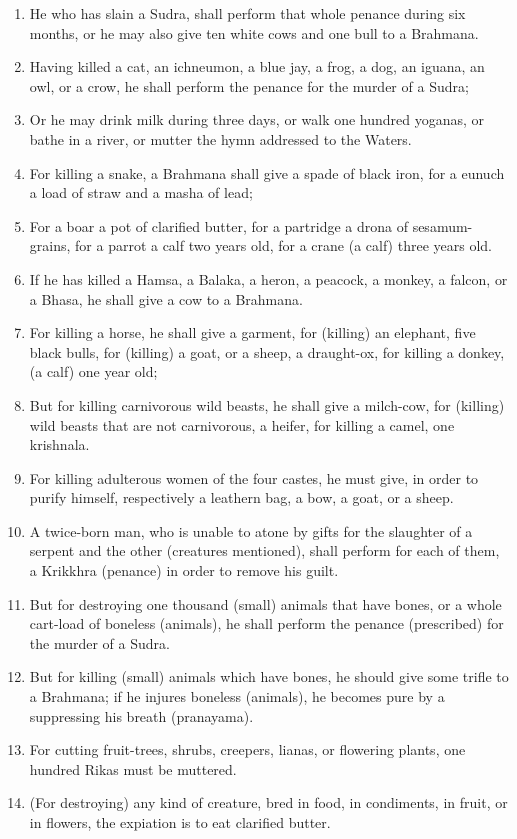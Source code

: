 \begin{enumerate}
\item He who has slain a Sudra, shall perform that whole penance during six months, or he may also give ten white cows and one bull to a Brahmana.
\item Having killed a cat, an ichneumon, a blue jay, a frog, a dog, an iguana, an owl, or a crow, he shall perform the penance for the murder of a Sudra;
\item Or he may drink milk during three days, or walk one hundred yoganas, or bathe in a river, or mutter the hymn addressed to the Waters.
\item For killing a snake, a Brahmana shall give a spade of black iron, for a eunuch a load of straw and a masha of lead;
\item For a boar a pot of clarified butter, for a partridge a drona of sesamum-grains, for a parrot a calf two years old, for a crane (a calf) three years old.
\item If he has killed a Hamsa, a Balaka, a heron, a peacock, a monkey, a falcon, or a Bhasa, he shall give a cow to a Brahmana.
\item For killing a horse, he shall give a garment, for (killing) an elephant, five black bulls, for (killing) a goat, or a sheep, a draught-ox, for killing a donkey, (a calf) one year old;
\item But for killing carnivorous wild beasts, he shall give a milch-cow, for (killing) wild beasts that are not carnivorous, a heifer, for killing a camel, one krishnala.
\item For killing adulterous women of the four castes, he must give, in order to purify himself, respectively a leathern bag, a bow, a goat, or a sheep.
\item A twice-born man, who is unable to atone by gifts for the slaughter of a serpent and the other (creatures mentioned), shall perform for each of them, a Krikkhra (penance) in order to remove his guilt.
\item But for destroying one thousand (small) animals that have bones, or a whole cart-load of boneless (animals), he shall perform the penance (prescribed) for the murder of a Sudra.
\item But for killing (small) animals which have bones, he should give some trifle to a Brahmana; if he injures boneless (animals), he becomes pure by a suppressing his breath (pranayama).
\item For cutting fruit-trees, shrubs, creepers, lianas, or flowering plants, one hundred Rikas must be muttered.
\item (For destroying) any kind of creature, bred in food, in condiments, in fruit, or in flowers, the expiation is to eat clarified butter.

\end{enumerate}
